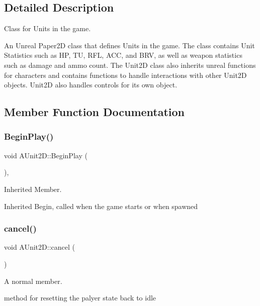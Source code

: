 \subsection{Detailed Description}
Class for Units in the game. 

An Unreal Paper2D class that defines Units in the game. The class contains Unit Statistics such as HP, TU, R\+FL, A\+CC, and B\+RV, as well as weapon statistics such as damage and ammo count. The Unit2D class also inherits unreal functions for characters and contains functions to handle interactions with other Unit2D objects. Unit2D also handles controls for its own object. 

\subsection{Member Function Documentation}
\hypertarget{class_a_unit2_d_a0251a37e303fe179ac987203df3b4f2f}{}\label{class_a_unit2_d_a0251a37e303fe179ac987203df3b4f2f} 
\subsubsection{\texorpdfstring{Begin\+Play()}{BeginPlay()}}
{\footnotesize\ttfamily void A\+Unit2\+D\+::\+Begin\+Play (\begin{DoxyParamCaption}{ }\end{DoxyParamCaption})\hspace{0.3cm}{\ttfamily [override]}, {\ttfamily [virtual]}}



Inherited Member. 

Inherited Begin, called when the game starts or when spawned \hypertarget{class_a_unit2_d_a96e805c919d9088872a5c8945a9ca31f}{}\label{class_a_unit2_d_a96e805c919d9088872a5c8945a9ca31f} 
\subsubsection{\texorpdfstring{cancel()}{cancel()}}
{\footnotesize\ttfamily void A\+Unit2\+D\+::cancel (\begin{DoxyParamCaption}{ }\end{DoxyParamCaption})}



A normal member. 

method for resetting the palyer state back to idle \hypertarget{class_a_unit2_d_a3a66da88663696462e73a5933c0d1032}{}\label{class_a_unit2_d_a3a66da88663696462e73a5933c0d1032} 
